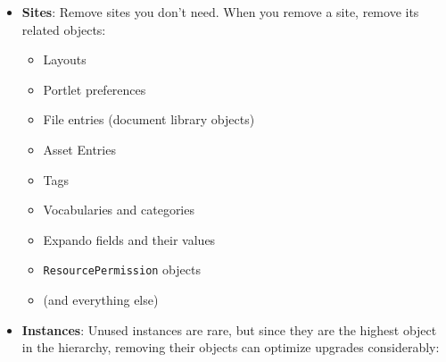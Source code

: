 \begin{itemize}
\item
  \textbf{Sites}: Remove sites you don't need. When you remove a site,
  remove its related objects:

  \begin{itemize}
  \item
    Layouts
  \item
    Portlet preferences
  \item
    File entries (document library objects)
  \item
    Asset Entries
  \item
    Tags
  \item
    Vocabularies and categories
  \item
    Expando fields and their values
  \item
    \texttt{ResourcePermission} objects
  \item
    (and everything else)
  \end{itemize}
\item
  \textbf{Instances}: Unused instances are rare, but since they are the
  highest object in the hierarchy, removing their objects can optimize
  upgrades considerably:


\end{itemize}
